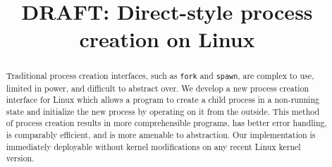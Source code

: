 \documentclass[letterpaper,twocolumn,10pt]{article}
\begin{document}
\newcommand{\twosigma}{{[tech company]}}
\newcommand{\githuburl}{[Github url removed]}
\date{}
\title{\Large \bf DRAFT: Direct-style process creation on Linux}
\maketitle
\begin{abstract}
Traditional process creation interfaces,
such as \texttt{fork} and \texttt{spawn},
are complex to use, limited in power, and difficult to abstract over.
We develop a new process creation interface for Linux
which allows a program to create a child process in a non-running state
and initialize the new process by operating on it from the outside.
This method of process creation results in more comprehensible programs, 
has better error handling,
is comparably efficient,
and is more amenable to abstraction.
Our implementation is immediately deployable without kernel modifications on any recent Linux kernel version.
\end{abstract}
\end{document}
